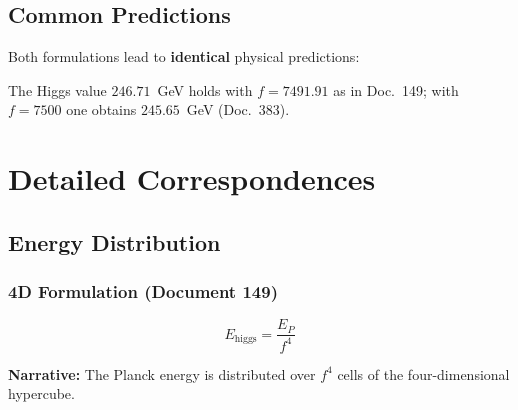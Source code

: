 	\subsection{Common Predictions}
	
	Both formulations lead to \textbf{identical} physical predictions:
	
	\begin{table}[h]
		\centering
		\caption{Identical predictions of both formulations}
	\end{table}

	The Higgs value $246.71$~GeV holds with $f = 7491.91$ as in Doc.~149; with $f = 7500$ one obtains $245.65$~GeV (Doc.~383).
	
	\section{Detailed Correspondences}
	
	\subsection{Energy Distribution}
	
	\subsubsection{4D Formulation (Document 149)}
	
	\begin{equation}
		E_{\text{higgs}} = \frac{E_P}{f^4}
	\end{equation}
	
	\textbf{Narrative:} The Planck energy is distributed over $f^4$ cells of the four-dimensional hypercube.
	
